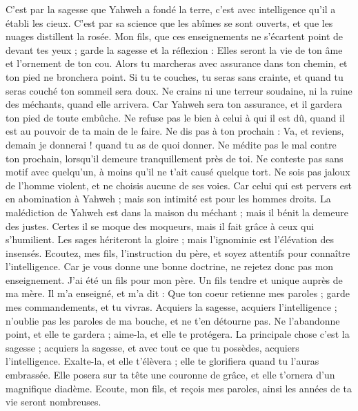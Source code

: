 \begin{multicols}{2}
C’est par la sagesse que Yahweh a fondé la terre, c’est avec intelligence qu’il a établi les cieux.
C’est par sa science que les abîmes se sont ouverts, et que les nuages distillent la rosée.
Mon fils, que ces enseignements ne s'écartent point de devant tes yeux ; garde la sagesse et la réflexion :
Elles seront la vie de ton âme et l'ornement de ton cou.
Alors tu marcheras avec assurance dans ton chemin, et ton pied ne bronchera point.
Si tu te couches, tu seras sans crainte, et quand tu seras couché ton sommeil sera doux.
Ne crains ni une terreur soudaine, ni la ruine des méchants, quand elle arrivera.
Car Yahweh sera ton assurance, et il gardera ton pied de toute embûche.
Ne refuse pas le bien à celui à qui il est dû, quand il est au pouvoir de ta main de le faire.
Ne dis pas à ton prochain : Va, et reviens, demain je donnerai ! quand tu as de quoi donner.
Ne médite pas le mal contre ton prochain, lorsqu’il demeure tranquillement près de toi.
Ne conteste pas sans motif avec quelqu’un, à moins qu'il ne t'ait causé quelque tort.
Ne sois pas jaloux de l'homme violent, et ne choisis aucune de ses voies.
Car celui qui est pervers est en abomination à Yahweh ; mais son intimité est pour les hommes droits.
La malédiction de Yahweh est dans la maison du méchant ; mais il bénit la demeure des justes.
Certes il se moque des moqueurs, mais il fait grâce à ceux qui s’humilient.
Les sages hériteront la gloire ; mais l'ignominie est l’élévation des insensés.
\VerseOne{}Ecoutez, mes fils, l'instruction du père, et soyez attentifs pour connaître l'intelligence.
Car je vous donne une bonne doctrine, ne rejetez donc pas mon enseignement.
J’ai été un fils pour mon père. Un fils tendre et unique auprès de ma mère.
Il m'a enseigné, et m'a dit : Que ton coeur retienne mes paroles ; garde mes commandements, et tu vivras.
Acquiers la sagesse, acquiers l’intelligence ; n’oublie pas les paroles de ma bouche, et ne t’en détourne pas.
Ne l'abandonne point, et elle te gardera ; aime-la, et elle te protégera.
La principale chose c'est la sagesse ; acquiers la sagesse, et avec tout ce que tu possèdes, acquiers l’intelligence.
Exalte-la, et elle t'élèvera ; elle te glorifiera quand tu l'auras embrassée.
Elle posera sur ta tête une couronne de grâce, et elle t’ornera d’un magnifique diadème.
Ecoute, mon fils, et reçois mes paroles, ainsi les années de ta vie seront nombreuses.

\end{multicols}
